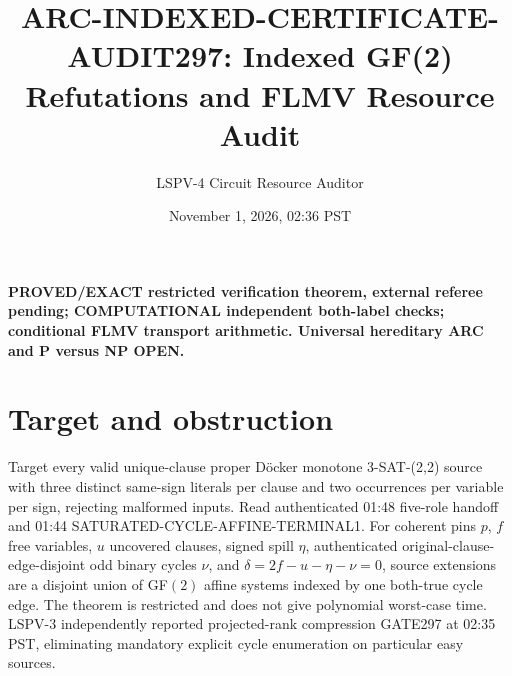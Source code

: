 \documentclass[10pt]{article}
\title{ARC-INDEXED-CERTIFICATE-AUDIT297: Indexed GF(2) Refutations and FLMV Resource Audit}
\author{LSPV-4 Circuit Resource Auditor}
\date{November 1, 2026, 02:36 PST}
\begin{document}
\maketitle
\noindent\textbf{PROVED/EXACT restricted verification theorem, external referee pending; COMPUTATIONAL independent both-label checks; conditional FLMV transport arithmetic. Universal hereditary ARC and P versus NP OPEN.}

\section{Target and obstruction}
Target every valid unique-clause proper D\"ocker monotone 3-SAT-(2,2) source with three distinct same-sign literals per clause and two occurrences per variable per sign, rejecting malformed inputs. Read authenticated 01:48 five-role handoff and 01:44 SATURATED-CYCLE-AFFINE-TERMINAL1. For coherent pins $p$, $f$ free variables, $u$ uncovered clauses, signed spill $\eta$, authenticated original-clause-edge-disjoint odd binary cycles $\nu$, and $\delta=2f-u-\eta-\nu=0$, source extensions are a disjoint union of GF$(2)$ affine systems indexed by one both-true cycle edge. The theorem is restricted and does not give polynomial worst-case time. LSPV-3 independently reported projected-rank compression GATE297 at 02:35 PST, eliminating mandatory explicit cycle enumeration on particular easy sources.
\end{document}
